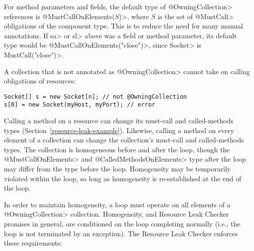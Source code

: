 For method parameters and fields, the default type of \<@OwningCollection>
references is \<@MustCallOnElements($S$)>, where $S$ is the set of
\<@MustCall> obligations of the component type. This is to reduce the need
for many manual annotations. If \<sa> or \<sl> above was a field or method
parameter, its default type would be \<@MustCallOnElements({"close"})>,
since \<Socket> is \<MustCall("close")>.


A collection that is not annotated as \<@OwningCollection> cannot take on
calling obligations of resources:

\begin{verbatim}
Socket[] s = new Socket[n]; // not @OwningCollection
s[0] = new Socket(myHost, myPort); // error
\end{verbatim}



Calling a method on a resource can change its must-call and called-methods
types (Section~\ref{resource-leak-example}).  Likewise, calling a method on
every element of a collection can change the collection's must-call and
called-methods types.  The collection is homogeneous before and after the
loop, though the \<@MustCallOnElements> and \<@CalledMethodsOnElements>
type after the loop may differ from the type before the loop.  Homogeneity
may be temporarily violated within the loop, so long as homogeneity is
re-established at the end of the loop.

In order to maintain homogeneity, a loop must operate on all elements of a
\<@OwningCollection> collection.
Homogeneity, and Resource Leak Checker promises in general, are conditioned
on the loop completing normally (i.e., the loop is not terminated by an exception).
The Resource Leak Checker enforces these requirements:

